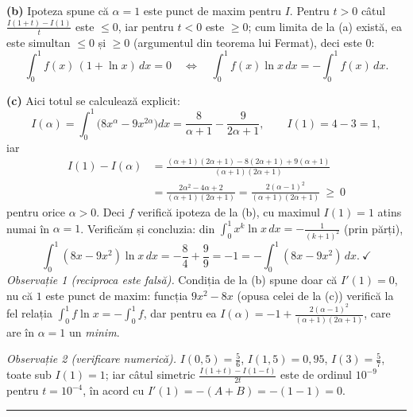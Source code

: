 \noindent\textbf{(b)} Ipoteza spune că $\alpha=1$ este punct de maxim pentru $I$. Pentru $t>0$ câtul $\frac{I(1+t)-I(1)}{t}$ este $\le0$, iar pentru $t<0$ este $\ge0$; cum limita de la (a) există, ea este simultan $\le0$ și $\ge0$ (argumentul din teorema lui Fermat), deci este $0$:
\[ \int_0^1f(x)\,(1+\ln x)\,dx=0\quad\Longleftrightarrow\quad\int_0^1f(x)\ln x\,dx=-\int_0^1f(x)\,dx . \]

\noindent\textbf{(c)} Aici totul se calculează explicit:
\[ I(\alpha)=\int_0^1\bigl(8x^{\alpha}-9x^{2\alpha}\bigr)dx=\frac{8}{\alpha+1}-\frac{9}{2\alpha+1},\qquad I(1)=4-3=1 , \]
iar
\[ \begin{aligned} I(1)-I(\alpha)&=\frac{(\alpha+1)(2\alpha+1)-8(2\alpha+1)+9(\alpha+1)}{(\alpha+1)(2\alpha+1)}\\ &=\frac{2\alpha^{2}-4\alpha+2}{(\alpha+1)(2\alpha+1)}=\frac{2(\alpha-1)^{2}}{(\alpha+1)(2\alpha+1)}\ \ge\ 0 \end{aligned} \]
pentru orice $\alpha>0$. Deci $f$ verifică ipoteza de la (b), cu maximul $I(1)=1$ atins numai în $\alpha=1$. Verificăm și concluzia: din $\int_0^1x^{k}\ln x\,dx=-\frac{1}{(k+1)^{2}}$ (prin părți),
\[ \int_0^1(8x-9x^{2})\ln x\,dx=-\frac84+\frac99=-1=-\int_0^1(8x-9x^{2})\,dx . \ \checkmark \]
\emph{Observație 1 (reciproca este falsă).} Condiția de la (b) spune doar că $I'(1)=0$, nu că $1$ este punct de maxim: funcția $9x^{2}-8x$ (opusa celei de la (c)) verifică la fel relația $\int_0^1 f\ln x=-\int_0^1 f$, dar pentru ea $I(\alpha)=-1+\frac{2(\alpha-1)^{2}}{(\alpha+1)(2\alpha+1)}$, care are în $\alpha=1$ un \emph{minim}.

\emph{Observație 2 (verificare numerică).} $I(0{,}5)=\frac56$, $I(1{,}5)=0{,}95$, $I(3)=\frac57$, toate sub $I(1)=1$; iar câtul simetric $\frac{I(1+t)-I(1-t)}{2t}$ este de ordinul $10^{-9}$ pentru $t=10^{-4}$, în acord cu $I'(1)=-(A+B)=-(1-1)=0$.
\vspace{1mm}\hrule
